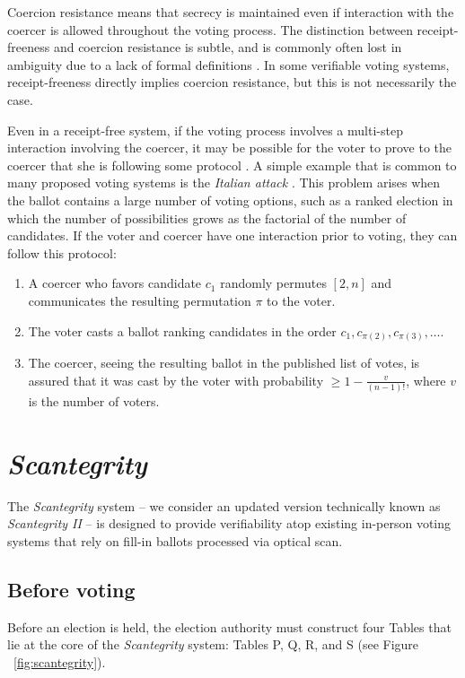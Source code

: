 \documentclass[10pt,twocolumn]{article}
\newcommand{\term}[1]{\textit{#1}}
\begin{document}
Coercion resistance means that secrecy is maintained even if interaction
with the coercer is allowed throughout the voting process.
The distinction between receipt-freeness and coercion resistance is subtle,
and is commonly often lost in ambiguity due to a lack of formal definitions \cite{delaune}.
In some verifiable voting systems, receipt-freeness directly implies coercion resistance,
but this is not necessarily the case.

Even in a receipt-free system,
if the voting process involves a multi-step interaction involving the coercer,
it may be possible for the voter to prove to the coercer that she is following
some protocol \cite{delaune}.
A simple example that is common to many proposed voting systems is
the \term{Italian attack} \cite{preta}.
This problem arises when the ballot contains a large number of voting options,
such as a ranked election in which the number of possibilities grows as the
factorial of the number of candidates.
If the voter and coercer have one interaction prior to voting,
they can follow this protocol:
\begin{enumerate}
\item A coercer who favors candidate $c_1$ randomly permutes $[2, n]$ and
communicates the resulting permutation $\pi$ to the voter.
\item The voter casts a ballot ranking candidates in the order
$c_1, c_{\pi(2)}, c_{\pi(3)}, \ldots$.
\item The coercer, seeing the resulting ballot in the published list of votes,
is assured that it was cast by the voter with probability
$\ge 1 - \frac{v}{(n-1)!}$, where $v$ is the number of voters.
\end{enumerate}

\section{\term{Scantegrity}}

The \term{Scantegrity} system \cite{scantegrity_ii}
-- we consider an updated version technically known as \term{Scantegrity II} --
is designed to provide verifiability atop existing in-person voting systems that
rely on fill-in ballots processed via optical scan.

\subsection{Before voting}

Before an election is held, the election authority must construct four Tables that lie at the core
of the \term{Scantegrity} system: Tables P, Q, R, and S (see Figure ~\ref{fig:scantegrity}).
\end{document}
